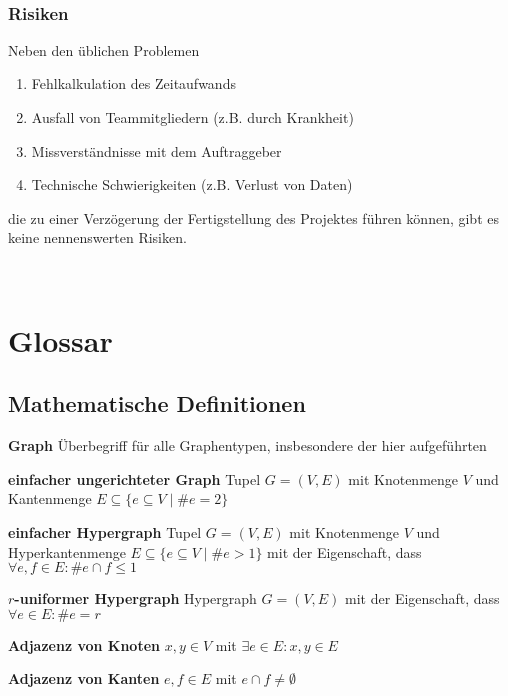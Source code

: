 \documentclass{article}
\begin{document}
	~\newpage
	\subsubsection{Risiken}
	Neben den üblichen Problemen
	\begin{enumerate}[--]
		\item{Fehlkalkulation des Zeitaufwands}
		\item{Ausfall von Teammitgliedern (z.B. durch Krankheit)}
		\item{Missverständnisse mit dem Auftraggeber}
		\item{Technische Schwierigkeiten (z.B. Verlust von Daten)}
	\end{enumerate}
	die zu einer Verzögerung der Fertigstellung des Projektes führen können, gibt es keine nennenswerten Risiken.
	
	~\newpage
	\section{Glossar}
	
	\subsection{Mathematische Definitionen}
	
	\textbf{Graph} \hspace*{.5em} Überbegriff für alle Graphentypen, insbesondere der hier aufgeführten
	
	\hangindent=1.5cm 
	\textbf{einfacher ungerichteter Graph} \newline
	Tupel $G=(V,E)$ mit Knotenmenge $V$ und Kantenmenge $E \subseteq \{e \subseteq V \mid \#e = 2\}$
	
	\hangindent=1.5cm 
	\textbf{einfacher Hypergraph} \newline
	Tupel $G = (V,E)$ mit Knotenmenge $V$ und Hyperkantenmenge $E \subseteq \{e \subseteq V \mid \# e > 1\}$ mit der Eigenschaft, dass $\forall e,f \in E: \# e \cap f \leq 1$
	
	\hangindent=1.5cm 
	\textbf{$r$-uniformer Hypergraph} \newline
	Hypergraph $G = (V,E)$ mit der Eigenschaft, dass $\forall e \in E: \# e = r$
	
	\hangindent=1.5cm 
	\textbf{Adjazenz von Knoten} \newline
	$x,y \in V$ mit $\exists e \in E: x,y \in E$
	
	\hangindent=1.5cm 
	\textbf{Adjazenz von Kanten} \newline
	$e,f \in E$ mit $e \cap f \neq \emptyset$
	
\end{document}
